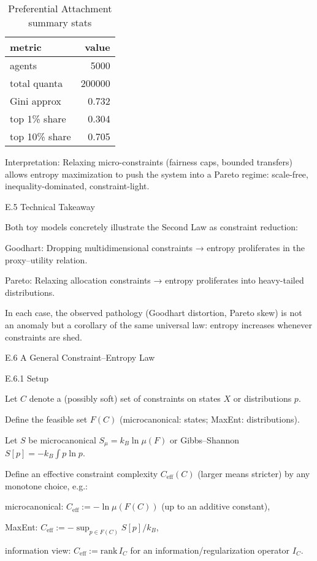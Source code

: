 \documentclass[11pt,a4paper]{article}
\begin{document}
\begin{table}[h]
\centering
\begin{tabular}{lr}
\toprule
metric & value \\
\midrule
agents & 5000 \\
total quanta & 200000 \\
Gini approx & 0.732 \\
top 1\% share & 0.304 \\
top 10\% share & 0.705 \\
\bottomrule
\end{tabular}
\caption{Preferential Attachment summary stats}
\end{table}

Interpretation: Relaxing micro-constraints (fairness caps, bounded transfers) allows entropy maximization to push the system into a Pareto regime: scale-free, inequality-dominated, constraint-light.

E.5 Technical Takeaway

Both toy models concretely illustrate the Second Law as constraint reduction:

Goodhart: Dropping multidimensional constraints → entropy proliferates in the proxy–utility relation.

Pareto: Relaxing allocation constraints → entropy proliferates into heavy-tailed distributions.

In each case, the observed pathology (Goodhart distortion, Pareto skew) is not an anomaly but a corollary of the same universal law: entropy increases whenever constraints are shed.

E.6 A General Constraint–Entropy Law

E.6.1 Setup

Let $C$ denote a (possibly soft) set of constraints on states $X$ or distributions $p$.

Define the feasible set $F(C)$ (microcanonical: states; MaxEnt: distributions).

Let $S$ be microcanonical $S_\mu = k_B \ln \mu(F)$ or Gibbs–Shannon $S[p] = -k_B \int p \ln p$.

Define an effective constraint complexity $C_\mathrm{eff}(C)$ (larger means stricter) by any monotone choice, e.g.:

microcanonical: $C_\mathrm{eff} := - \ln \mu(F(C))$ (up to an additive constant),

MaxEnt: $C_\mathrm{eff} := - \sup_{p \in F(C)} S[p] / k_B$,

information view: $C_\mathrm{eff} := \mathrm{rank}\, I_C$ for an information/regularization operator $I_C$.
\end{document}
